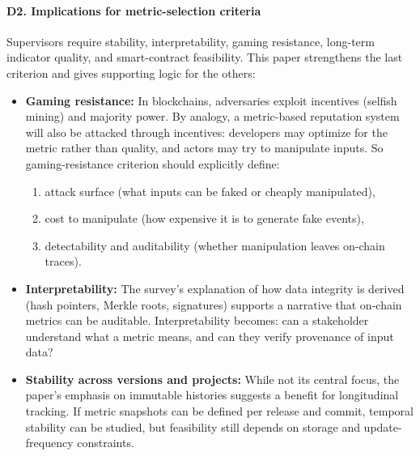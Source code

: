 \documentclass[11pt,a4paper]{article}
\begin{document}
\paragraph{D2. Implications for metric-selection criteria}
Supervisors require stability, interpretability, gaming resistance, long-term indicator quality, and smart-contract feasibility. This paper strengthens the last criterion and gives supporting logic for the others:
\begin{itemize}[leftmargin=*]
  \item \textbf{Gaming resistance:} In blockchains, adversaries exploit incentives (selfish mining) and majority power. By analogy, a metric-based reputation system will also be attacked through incentives: developers may optimize for the metric rather than quality, and actors may try to manipulate inputs. So gaming-resistance criterion should explicitly define:
  \begin{enumerate}[leftmargin=*]
    \item attack surface (what inputs can be faked or cheaply manipulated),
    \item cost to manipulate (how expensive it is to generate fake events),
    \item detectability and auditability (whether manipulation leaves on-chain traces).
  \end{enumerate}
  \item \textbf{Interpretability:} The survey's explanation of how data integrity is derived (hash pointers, Merkle roots, signatures) supports a narrative that on-chain metrics can be auditable. Interpretability becomes: can a stakeholder understand what a metric means, and can they verify provenance of input data?
  \item \textbf{Stability across versions and projects:} While not its central focus, the paper's emphasis on immutable histories suggests a benefit for longitudinal tracking. If metric snapshots can be defined per release and commit, temporal stability can be studied, but feasibility still depends on storage and update-frequency constraints.
\end{itemize}
\end{document}
